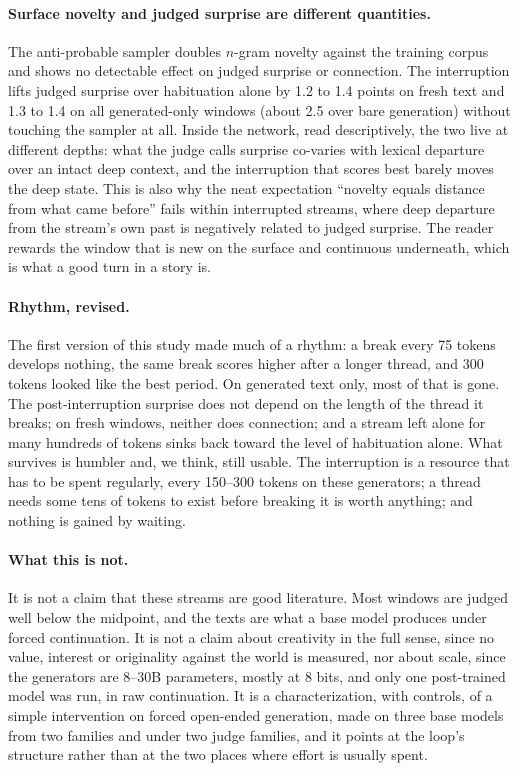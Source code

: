 \paragraph{Surface novelty and judged surprise are different quantities.}
The anti-probable sampler doubles $n$-gram novelty against the training
corpus and shows no detectable effect on judged surprise or connection. The
interruption lifts judged surprise over habituation alone by 1.2 to 1.4
points on fresh text and 1.3 to 1.4 on all generated-only windows (about 2.5
over bare generation) without touching the sampler at all. Inside
the network, read descriptively, the two live at different depths: what the
judge calls surprise co-varies with lexical departure over an intact deep
context, and the interruption that scores best barely moves the deep state.
This is also why the neat expectation ``novelty equals distance from what
came before'' fails within interrupted streams, where deep departure from
the stream's own past is negatively related to judged surprise. The reader
rewards the window that is new on the surface and continuous underneath,
which is what a good turn in a story is.

\paragraph{Rhythm, revised.} The first version of this study made much of a
rhythm: a break every 75 tokens develops nothing, the same break scores
higher after a longer thread, and 300 tokens looked like the best period. On
generated text only, most of that is gone. The post-interruption surprise
does not depend on the length of the thread it breaks; on fresh windows,
neither does connection; and a stream left alone for many hundreds of tokens
sinks back toward the level of habituation alone. What survives is humbler
and, we think, still usable. The interruption is a resource that has to be
spent regularly, every 150--300 tokens on these generators; a thread needs
some tens of tokens to exist before breaking it is worth anything; and
nothing is gained by waiting.

\paragraph{What this is not.} It is not a claim that these streams are good
literature. Most windows are judged well below the midpoint, and the texts
are what a base model produces under forced continuation. It is not a claim
about creativity in the full sense, since no value, interest or originality
against the world is measured, nor about scale, since the generators are
8--30B parameters, mostly at 8 bits, and only one post-trained model was
run, in raw continuation. It is a characterization, with controls, of a
simple intervention on forced open-ended generation, made on three base
models from two families and under two judge families, and it points at the
loop's structure rather than at the two places where effort is usually
spent.

